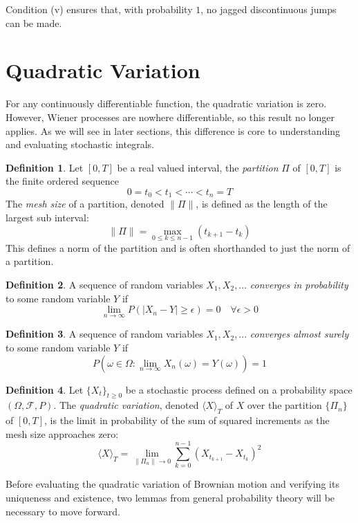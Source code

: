 \documentclass[12pt]{article}
\theoremstyle{definition}
\newtheorem{definition}{Definition}[section]
\theoremstyle{plain}
\theoremstyle{remark}
\begin{document}
Condition (v) ensures that, with probability $1$, no jagged discontinuous jumps can be made.




\section{Quadratic Variation}

For any continuously differentiable function, the quadratic variation is zero.  However, Wiener processes are nowhere differentiable, so this result no longer applies.  As we will see in later sections, this difference is core to understanding and evaluating stochastic integrals.

\begin{definition}
Let $[0,T]$ be a real valued interval, the \textit{partition} $\Pi$ of $[0,T]$ is the finite ordered sequence
\[
0 = t_0< t_1 < \cdots < t_n = T
\]
The \textit{mesh size} of a partition, denoted $\|\Pi\|$, is defined as the length of the largest sub interval:
\[
\|\Pi\| = \max_{0 \leq k \leq n-1} (t_{k+1} - t_k)
\]
This defines a norm of the partition and is often shorthanded to just the norm of a partition.
\end{definition}

\begin{definition}
A sequence of random variables $X_1,X_2,...$ \textit{converges in probability} to some random variable $Y$ if
\[
\lim_{n\to\infty}P(|X_n-Y|\geq \epsilon) = 0 \quad \forall\epsilon>0
\]
\end{definition}

\begin{definition}
A sequence of random variables $X_1,X_2,...$ \textit{converges almost surely} to some random variable $Y$ if
\[
P\left(\omega \in \Omega : \lim_{n \to \infty} X_n(\omega) = Y(\omega)\right) = 1
\]
\end{definition}

\begin{definition}
Let $\{X_t \}_{t \geq 0}$ be a stochastic process defined on a probability space $(\Omega, \mathcal{F}, P)$.  The \textit{quadratic variation}, denoted $\langle X\rangle_T$ of $X$ over the partition $\{ \Pi_n\}$ of $[0,T]$, is the limit in probability of the sum of squared increments as the mesh size approaches zero:
\[
\langle X\rangle_T=\lim_{\|\Pi_n\| \to 0} \sum_{k=0}^{n-1} (X_{t_{k+1}} - X_{t_k})^2
\]
\end{definition}

Before evaluating the quadratic variation of Brownian motion and verifying its uniqueness and existence, two lemmas from general probability theory will be necessary to move forward.
\end{document}
